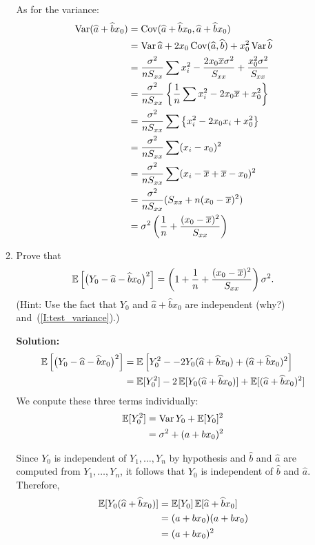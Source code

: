 \documentclass[12pt]{amsart}
\newcommand{\sol}{\bigskip\noindent\textbf{Solution: }}
\begin{document}
\begin{enumerate}
\begin{enumerate}
        As for the variance:
        \begin{align*}
            \operatorname{Var}(\widehat a + \widehat b x_0) &= \operatorname{Cov}(\widehat a + \widehat b x_0, \widehat a + \widehat b x_0)\\
            &= \operatorname{Var} \widehat a  + 2x_0\operatorname{Cov}(\widehat a, \widehat b) + x_0^2\operatorname{Var}\widehat b\\
            &= \frac{\sigma^2}{nS_{xx}}\sum x_i^2 - \frac{2x_0\overline x\sigma^2}{S_{xx}} + \frac{x_0^2\sigma^2}{S_{xx}}\\
            &= \frac{\sigma^2}{nS_{xx}}\left\{\frac1n\sum x_i^2 - 2x_0\overline x + x_0^2\right\}\\
            &= \frac{\sigma^2}{nS_{xx}}\sum \left\{x_i^2 - 2x_0 x_i + x_0^2\right\}\\
            &= \frac{\sigma^2}{nS_{xx}}\sum (x_i - x_0)^2\\
            &= \frac{\sigma^2}{nS_{xx}}\sum (x_i - \overline x + \overline x - x_0)^2\\
            &= \frac{\sigma^2}{nS_{xx}}(S_{xx} + n(x_0 - \overline x)^2)\\
            &= \sigma^2\left(\frac 1 n + \frac{(x_0 - \overline x)^2}{S_{xx}}\right)
        \end{align*}
        
        \item\label{I:test_variance} Prove that
        \[
            \operatorname{\mathbb{E}}\left[\big(Y_0 - \widehat a - \widehat b x_0\big)^2\right] = \left(1 + \frac1n + \frac{(x_0-\overline x)^2}{S_{xx}} \right)\sigma^2.
        \]
        (Hint: Use the fact that $Y_0$ and $\hat a + \hat b x_0$ are independent (why?) and~(\ref{I:test_variance}).)

        \sol
        \begin{align*}
            \operatorname{\mathbb{E}}\left[\big(Y_0 - \widehat a - \widehat b x_0\big)^2\right] &=
            \operatorname{\mathbb{E}}\left[Y_0^2 - -2Y_0(\widehat a + \widehat b x_0) + (\widehat a + \widehat b x_0)^2\right]\\
            &= \operatorname{\mathbb{E}}[Y_0^2] - 2\operatorname{\mathbb{E}}[Y_0(\widehat a + \widehat b x_0)] + \operatorname{\mathbb{E}}[(\widehat a + \widehat b x_0)^2]
        \end{align*}
        We conpute these three terms individually:
        \begin{align*}
            \operatorname{\mathbb{E}}[Y_0^2] &= \operatorname{Var} Y_0 + \operatorname{\mathbb{E}}[Y_0]^2\\
            &= \sigma^2 + (a + bx_0)^2
        \end{align*}

        Since $Y_0$ is independent of $Y_1,\ldots,Y_n$ by hypothesis
        and $\hat b$ and $\hat a$ are computed from $Y_1,\ldots,Y_n$,
        it follows that $Y_0$ is independent of $\hat b$ and $\hat a$. Therefore,
        \begin{align*}
            \operatorname{\mathbb{E}}[Y_0(\widehat a + \widehat b x_0)] &= \operatorname{\mathbb{E}}[Y_0]\operatorname{\mathbb{E}}[\widehat a + \widehat b x_0]\\
            &= (a+bx_0)(a+bx_0)\\
            &= (a+bx_0)^2
        \end{align*}


\end{enumerate}
\end{enumerate}
\end{document}
